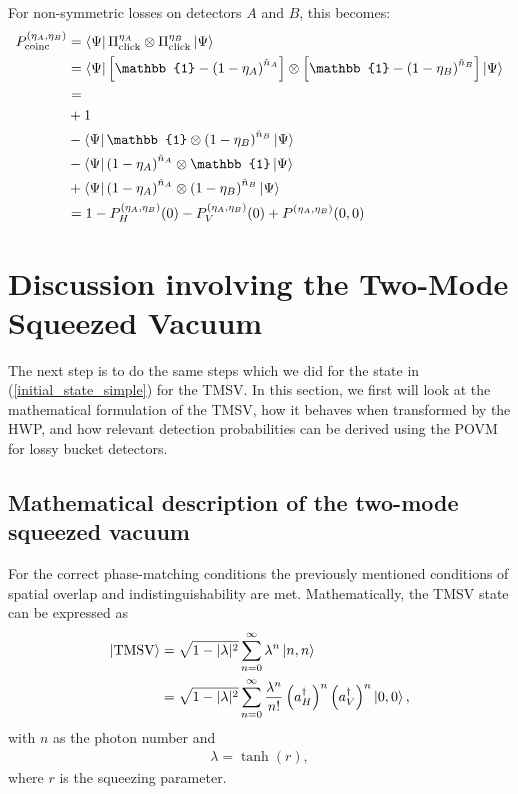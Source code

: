 \documentclass[%
 reprint,
 amsmath,amssymb,
 aps,
twocolumn
]{revtex4-2}
\begin{document}
For non-symmetric losses on detectors $A$ and $B$, this becomes:
\begin{align}
P_{\text{coinc}}^{(\eta_A,\eta_B)} &= \bra{\Psi}\Pi_{\text{click}}^{\eta_A}\otimes\Pi_{\text{click}}^{\eta_B}\ket{\Psi}\notag\\
&=\bra{\Psi}\left[\mathbb{1}-\left(1-\eta_A\right)^{\hat{n}_A}\right]\otimes \left[\mathbb{1}-\left(1-\eta_B\right)^{\hat{n}_B}\right]\ket{\Psi}\notag\\
&=\notag\\
&+1\notag\\
&-\bra{\Psi}\mathbb{1}\otimes\left(1-\eta_B\right)^{\hat{n}_B}\ket{\Psi}\notag\\
&-\bra{\Psi}\left(1-\eta_A\right)^{\hat{n}_A}\otimes \mathbb{1}\ket{\Psi}\notag\\
&+\bra{\Psi}\left(1-\eta_A\right)^{\hat{n}_A}\otimes \left(1-\eta_B\right)^{\hat{n}_B}\ket{\Psi}\\
&= 1 - P_H^{(\eta_A,\eta_B)}(0) - P_V^{(\eta_A,\eta_B)}(0) + P^{(\eta_A,\eta_B)}(0,0)\label{formula_P_cc_loss}
\end{align}

\section{\label{sec:s2} Discussion involving the Two-Mode Squeezed Vacuum}
The next step is to do the same steps which we did for the state in (\ref{initial_state_simple}) for the TMSV. In this section, we first will look at the mathematical formulation of the TMSV, how it behaves when transformed by the HWP, and how relevant detection probabilities can be derived using the POVM for lossy bucket detectors.
\subsection{Mathematical description of the two-mode squeezed vacuum}
For the correct phase-matching conditions the previously mentioned conditions of spatial overlap and indistinguishability are met. Mathematically, the TMSV state can be expressed as
\begin{align}
\label{tmsv}
    \ket{\text{TMSV}}&=\sqrt{1-|\lambda|^2}\sum_{n=0}^{\infty}\lambda^n\ket{n,n}\\
                     &=\sqrt{1-|\lambda|^2}\sum_{n=0}^{\infty}\dfrac{\lambda^n}{n!}\left(a_H^\dagger\right)^n\left(a_V^\dagger\right)^n\ket{0,0},
\end{align}
with $n$ as the photon number and
\begin{align}
    \lambda=\tanh(r),
\end{align}
where $r$ is the squeezing parameter. 
\end{document}
